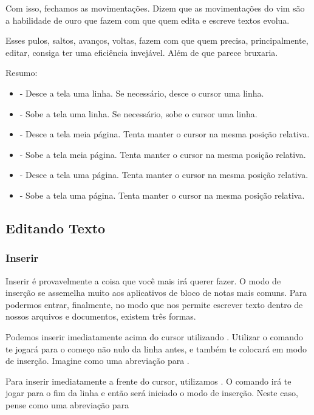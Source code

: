 Com isso, fechamos as movimentações.
Dizem que as movimentações do vim são a habilidade de ouro que fazem com que quem edita e escreve textos evolua.

Esses pulos, saltos, avanços, voltas, fazem com que quem precisa, principalmente, editar, consiga ter uma eficiência invejável.
Além de que parece bruxaria.

Resumo:
\begin{itemize}
    \item {} - Desce a tela uma linha. Se necessário, desce o cursor uma linha.
    \item {} - Sobe a tela uma linha. Se necessário, sobe o cursor uma linha.
    \item {} - Desce a tela meia página. Tenta manter o cursor na mesma posição relativa.
    \item {} - Sobe a tela meia página. Tenta manter o cursor na mesma posição relativa.
    \item {} - Desce a tela uma página. Tenta manter o cursor na mesma posição relativa.
    \item {} - Sobe a tela uma página. Tenta manter o cursor na mesma posição relativa.
\end{itemize}

\subsection{Editando Texto}

\subsubsection{Inserir}
Inserir é provavelmente a coisa que você mais irá querer fazer.
O modo de inserção se assemelha muito aos aplicativos de bloco de notas mais comuns.
Para podermos entrar, finalmente, no modo que nos permite escrever texto dentro de nossos
arquivos e documentos, existem três formas.

Podemos inserir imediatamente acima do cursor utilizando .
Utilizar o comando  te jogará para o começo não nulo da linha antes,
e também te colocará em modo de inserção.
Imagine como uma abreviação para \vimcommand{\^}.

Para inserir imediatamente a frente do cursor, utilizamos .
O comando  irá te jogar para o fim da linha e então será iniciado o modo de inserção.
Neste caso, pense como uma abreviação para 

